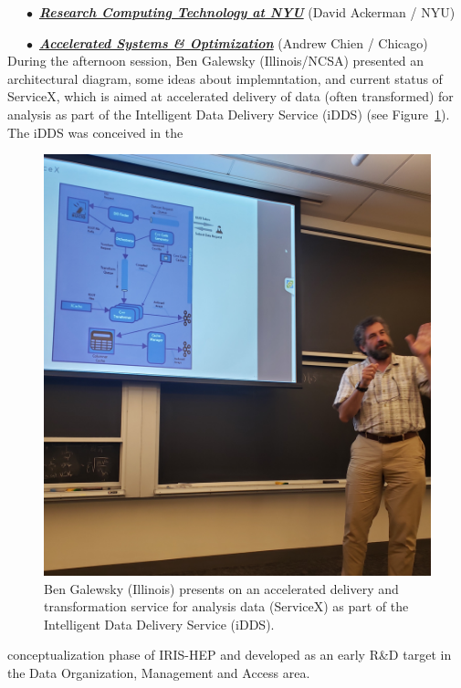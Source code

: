 \documentclass[11pt,letterpaper,fleqn]{article}
\begin{document}
\noindent~~~$\bullet$~\href{https://indico.cern.ch/event/820946/contributions/3461596/attachments/1867159/3070772/go}{\textbf{\textit{Research Computing Technology at NYU}}} (David Ackerman / NYU)

\noindent~~~$\bullet$~\href{https://indico.cern.ch/event/820946/contributions/3464565/attachments/1867166/3070786/IRIS-HEP-Accelerated-Scalability-6-21-2019-v2.pdf}{\textbf{\textit{Accelerated Systems \& Optimization}}} (Andrew Chien / Chicago) \\

\vspace{-0.2cm}
During the afternoon session, Ben Galewsky (Illinois/NCSA) presented an architectural diagram, some ideas about implemntation, and current status of ServiceX, which is aimed at accelerated delivery of data (often transformed) for analysis as part of the Intelligent Data Delivery Service (iDDS) (see Figure~\ref{fig:galewsky_servicex}). The iDDS was conceived in the
\begin{figure}
  \centering
  \includegraphics[width=0.9\linewidth]{figures/galewsky_servicex.jpg}
  \vspace{-0.3cm}
  \caption{Ben Galewsky (Illinois) presents on an accelerated delivery and transformation service for analysis data (ServiceX) as part of the Intelligent Data Delivery Service (iDDS).}
  \label{fig:galewsky_servicex}
\end{figure}
conceptualization phase of IRIS-HEP and developed as an early R\&D target in the Data Organization, Management and Access area.
\end{document}
